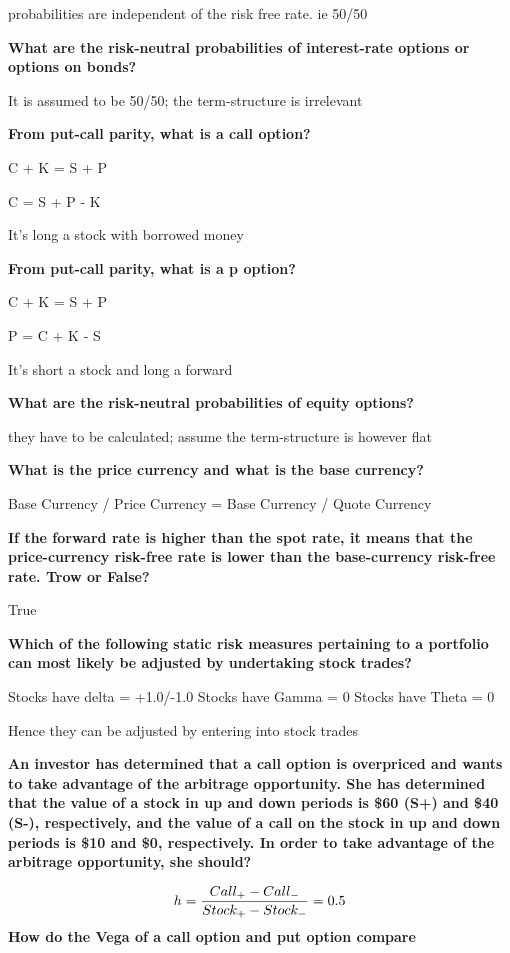 \documentclass[12pt]{article}
\begin{document}
probabilities are independent of the risk free rate. ie 50/50

\textbf{What are the risk-neutral probabilities of interest-rate options or options on bonds?}

It is assumed to be 50/50; the term-structure is irrelevant

\textbf{From put-call parity, what is a call option?}

C + K = S + P

C = S + P - K

It's long a stock with borrowed money

\textbf{From put-call parity, what is a p option?}

C + K = S + P

P = C + K - S

It's short a stock and long a forward


\textbf{What are the risk-neutral probabilities of  equity options?}

they have to be calculated; assume the term-structure is however flat

\textbf{What is the price currency and what is the base currency?}

Base Currency / Price Currency = Base Currency / Quote Currency

\textbf{ If the forward rate is higher than the spot rate, it means that the price-currency risk-free rate is lower than the base-currency risk-free rate. Trow or False?}

True

\textbf{Which of the following static risk measures pertaining to a portfolio can most likely be adjusted by undertaking stock trades?}

Stocks have delta = +1.0/-1.0
Stocks have Gamma = 0
Stocks have Theta = 0

Hence they can be adjusted by entering into stock trades

\textbf{
	An investor has determined that a call option is overpriced and wants to take advantage of the arbitrage opportunity. She has determined that the value of a stock in up and down periods is \$60 (S+) and \$40 (S-), respectively, and the value of a call on the stock in up and down periods is \$10 and \$0, respectively. In order to take advantage of the arbitrage opportunity, she should?}

$$
h = \dfrac{Call_{+} - Call_{-}}{Stock_{+} - Stock_{-}} \\
= 0.5
$$
\textbf{How do the Vega of a call option and put option compare}
\end{document}
